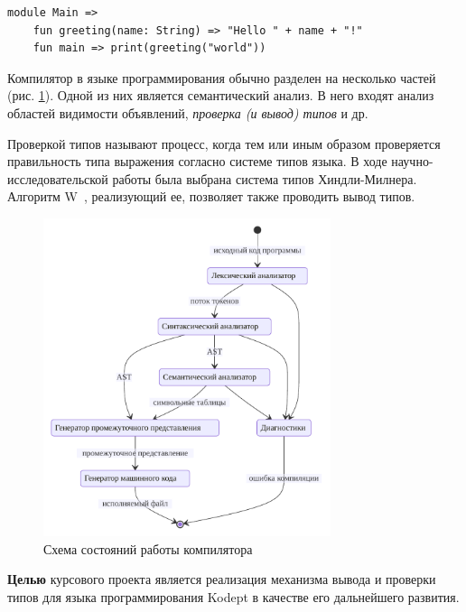 \begin{lstlisting}[label={lst:syntax},caption={Демонстрация синтаксиса языка Kodept}]
    module Main =>
    fun greeting(name: String) => "Hello " + name + "!"
    fun main => print(greeting("world"))
\end{lstlisting}

Компилятор в языке программирования обычно разделен на несколько частей (рис. \ref{fig:pipeline}).
Одной из них является семантический анализ.
В него входят анализ областей видимости объявлений, \textit{проверка (и вывод) типов} и др.

Проверкой типов называют процесс, когда тем или иным образом проверяется правильность типа выражения согласно системе типов языка.
В ходе научно-исследовательской работы была выбрана система типов Хиндли-Милнера.
Алгоритм W~\cite{UrbanN2009}, реализующий ее, позволяет также проводить вывод типов.

\begin{figure}[H]
    \centering
    \includegraphics[width=0.75\textwidth]{figures/pipeline}
    \caption{Схема состояний работы компилятора}
    \label{fig:pipeline}
\end{figure}

\textbf{Целью} курсового проекта является реализация механизма вывода и проверки типов для языка программирования Kodept в качестве его дальнейшего развития.

